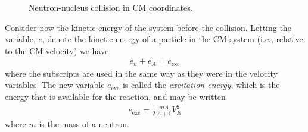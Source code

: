 \documentclass[11pt]{article}
\renewcommand\vec{\mathbf}
\begin{document}
\begin{figure}
\centering
{}
\caption{Neutron-nucleus collision in CM coordinates.}
\label{fig::scatteringCM}
\end{figure}

Consider now the kinetic energy of the system before the collision.  Letting the variable, \(e\), denote the kinetic energy of a particle in the CM system (i.e., relative to the CM velocity) we  have
\begin{align}
  e_n + e_A = e_{\text{exc}}
\end{align}
where the subscripts are used in the same way as they were in the velocity variables.  The new variable \(e_{\text{exc}}\) is called the \emph{excitation energy}, which is the energy that is available for the reaction, and may be written
\begin{align}
  e_{\text{exc}} = \frac{1}{2} \frac{mA}{A+1}V_R^2
\end{align}
where \(m\) is the mass of a neutron.
\end{document}
